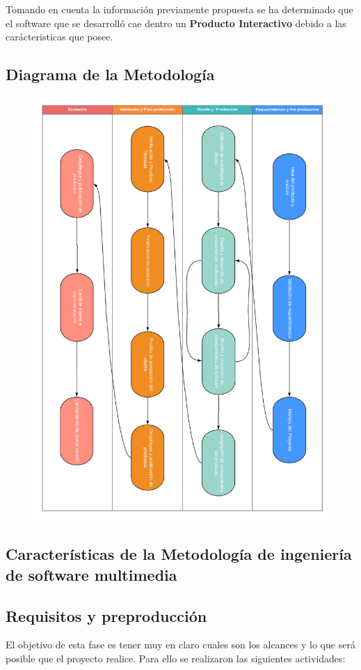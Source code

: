 Tomando en cuenta la informaci\'on previamente propuesta se ha determinado que el software que se desarroll\'o cae dentro  un \textbf{Producto Interactivo} debido a las car\'acteristicas que posee. 

  \subsection{Diagrama de la Metodolog\'ia}
  \begin{figure}[H]
  	\begin{center}
   		\includegraphics[width = .80\textwidth]{v2/images/image26.png}
  	\end{center} 
  \end{figure}

  \subsection{Características de la Metodología de ingeniería de software multimedia}
  \subsection{Requisitos y preproducción}
  El objetivo de esta fase es tener muy en claro cuales son los alcances y lo que será posible que el proyecto realice. Para ello se  realizaron las siguientes actividades:\\

